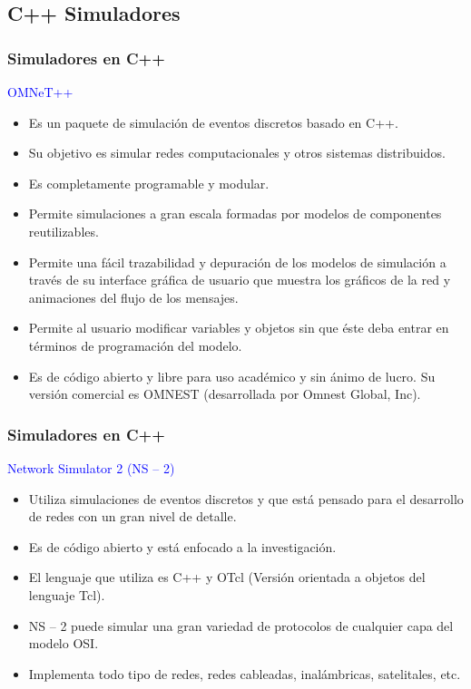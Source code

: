 \documentclass{beamer}
\begin{document}
\subsection{C++ Simuladores }

%
%
\begin{frame}[fragile] %
	
	\frametitle{Simuladores en C++}
	\textcolor{blue}{OMNeT++}
	\begin{itemize}
		\item Es un paquete de simulación de eventos discretos basado en C++.
		\item Su objetivo es simular redes computacionales y otros sistemas distribuidos. 
		\item Es completamente programable y modular.
		\item Permite simulaciones a gran escala formadas por modelos de componentes reutilizables. 
		\item Permite una fácil trazabilidad y depuración de los modelos de simulación a través de su interface gráfica de usuario que muestra los gráficos de la red y animaciones del flujo de los mensajes.
		\item Permite al usuario modificar variables y objetos sin que éste deba entrar en términos de programación del modelo.
		\item Es de código abierto y libre para uso académico y sin ánimo de lucro. Su versión comercial es OMNEST (desarrollada por Omnest Global, Inc).
		
	\end{itemize}
	
\end{frame}
%
%
\begin{frame}
	\frametitle{Simuladores en C++}
	\textcolor{blue}{Network Simulator 2 (NS – 2)}
	\vspace{0.5cm}
	\begin{itemize}
		\item Utiliza simulaciones de eventos discretos y que está pensado para el desarrollo de redes con un gran nivel de detalle. 
		\item Es de código abierto y está enfocado a la investigación.
		\item El lenguaje que utiliza es C++ y OTcl (Versión orientada a objetos del lenguaje Tcl).
		\item NS – 2 puede simular una gran variedad de protocolos de cualquier capa del modelo OSI.
		\item Implementa todo tipo de redes, redes cableadas, inalámbricas, satelitales, etc.
	\end{itemize}
	
	
\end{frame}
\end{document}
